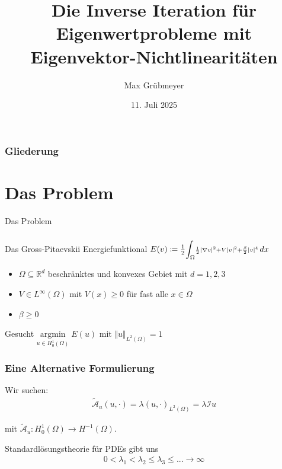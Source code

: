 \documentclass{beamer}
\title[]{Die Inverse Iteration für Eigenwertprobleme mit Eigenvektor-Nichtlinearitäten}
\author{Max Grübmeyer}
\date{11. Juli 2025}
\newcommand{\sectionstart}[1]{
    \section{#1}
    \begin{frame}
        \centering
        \huge{#1}
    \end{frame}
}
\newcommand{\Rd}{\ensuremath{\mathbb{R}^d}}
\newcommand{\Ltwo}{\ensuremath{{L^2(\Omega)}}}
\newcommand{\Honez}{\ensuremath{{H^1_0(\Omega)}}}
\newcommand{\Hdual}{\ensuremath{{H^{-1}(\Omega)}}}
\newcommand{\mAh}{\ensuremath{\mathcal{\tilde{A}}}}
\newcommand{\mI}{\ensuremath{\mathcal{I}}}
\begin{document}
    \begin{frame}
        \titlepage
    \end{frame}

    \begin{frame}
        \frametitle{Gliederung}
        \tableofcontents[hideallsubsections]
    \end{frame}

    \sectionstart{Das Problem}

    \begin{frame}
        \frametitle{\insertsection}
        \begin{block}{Das Gross-Pitaevskii Energiefunktional}
            \centering
            $E(v) \coloneq \frac{1}{2} \mathlarger{\int}_{\Omega} \mathsmaller{\frac{1}{2}\vert \nabla v \vert ^2 + V \vert v \vert ^2 + \frac{\beta}{2}\vert v \vert ^4} \,dx$
        \end{block}

        \pause
        \bigskip

        \begin{itemize}
            \item $\Omega \subseteq \Rd$ beschränktes und konvexes Gebiet mit $d = 1,2,3$
                \pause
            \item $V \in L^\infty(\Omega)$ mit $V(x) \geq 0 $ für fast alle $x \in \Omega$
                \pause
            \item $\beta \geq 0$
        \end{itemize}

        \pause
        \bigskip

        \centering
        Gesucht $\underset{u \in H^1_0(\Omega)}{\mathrm{argmin}}\;E(u)$ mit $\Vert u \Vert_\Ltwo = 1$
    \end{frame}

    \begin{frame}
        \frametitle{Eine Alternative Formulierung}

        Wir suchen:
        \begin{align*}
            \mAh_u(u,\cdot) = \lambda(u,\cdot)_\Ltwo = 
            \lambda \mI u
        \end{align*}

        mit $\mAh_u: \Honez \rightarrow \Hdual$.

        \pause
        \bigskip

        \begin{block}{}
            Standardlösungstheorie für PDEs gibt uns
            \begin{align*}
                0 < \lambda_1 < \lambda_2 \leq \lambda_3 \leq ... \rightarrow \infty
            \end{align*}
        \end{block}
    \end{frame}
\end{document}
